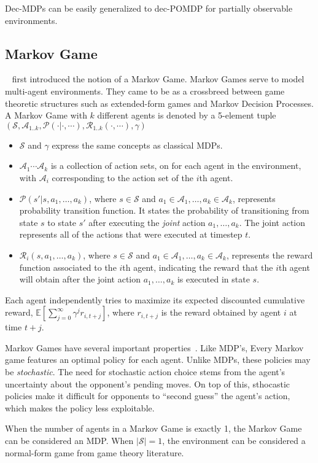 \documentclass{../main.tex}{subfile}
\begin{document}
Dec-MDPs can be easily generalized to dec-POMDP for partially observable environments.
\subsection{Markov Game}

~\cite{Owen1982} first introduced the notion of a Markov Game. Markov Games serve to model multi-agent environments. They came to be as a crossbreed between game theoretic structures such as extended-form games and Markov Decision Processes. 
A Markov Game with $k$ different agents is denoted by a 5-element tuple $(\mathcal{S}, {\mathcal{A}_{1..k}}, \mathcal{P}(\cdot | \cdot, \cdots), {\mathcal{R}_{1..k}(\cdot, \cdots)}, \gamma)$
\begin{itemize}
    \item $\mathcal{S}$ and $\gamma$ express the same concepts as classical MDPs.
    \item ${\mathcal{A}_1 \cdots \mathcal{A}_k}$ is a collection of action sets, on for each agent in the environment, with $\mathcal{A}_i$ corresponding to the action set of the $i$th agent.
    \item $\mathcal{P}(s' | s, a_1, \ldots, a_k)$, where $s \in \mathcal{S}$ and $a_1 \in \mathcal{A}_1, \ldots, a_k \in \mathcal{A}_k$, represents probability transition function. It states the probability of transitioning from state $s$ to state $s'$ after executing the \textit{joint} action ${a_1, \ldots, a_k}$. The joint action represents all of the actions that were executed at timestep $t$.
    \item $\mathcal{R}_i(s, a_1, \ldots, a_k)$, where $s \in \mathcal{S}$ and $a_1 \in \mathcal{A}_1, \ldots, a_k \in \mathcal{A}_k$, represents the reward function associated to the $i$th agent, indicating the reward that the $i$th agent will obtain after the joint action ${a_1, \ldots, a_k}$ is executed in state $s$.
\end{itemize}

Each agent independently tries to maximize its expected discounted cumulative reward, $\mathbb{E}[\sum_{j=0}^{\infty} \gamma^{j} r_{i,t+j}]$, where $r_{i, t+j}$ is the reward obtained by agent $i$ at time $t+j$.

Markov Games have several important properties~\cite{Owen1982, Littman1994}. Like MDP's, Every Markov game features an optimal policy for each agent. Unlike MDPs, these policies may be \textit{stochastic}. The need for stochastic action choice stems from the agent's uncertainty about the opponent's pending moves. On top of this, sthocastic policies make it difficult for opponents to ``second guess'' the agent's action, which makes the policy less exploitable. 

When the number of agents in a Markov Game is exactly 1, the Markov Game can be considered an MDP\@. When $|\mathcal{S}| = 1$, the environment can be considered a normal-form game from game theory literature.
\end{document}
